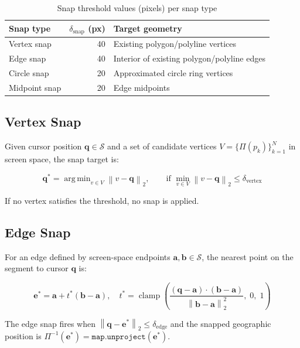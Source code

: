 \documentclass[12pt,a4paper]{article}
\theoremstyle{definition}
\theoremstyle{plain}
\theoremstyle{remark}
\newcommand{\norm}[1]{\left\lVert #1 \right\rVert}
\newcommand{\vect}[1]{\mathbf{#1}}
\DeclareMathOperator*{\argmin}{arg\,min}
\begin{document}
\begin{table}[H]
\centering
\caption{Snap threshold values (pixels) per snap type}
\label{tab:snap_thresholds}
\begin{tabular}{lrl}
\toprule
\textbf{Snap type} & $\delta_{\text{snap}}$ \textbf{(px)} & \textbf{Target geometry} \\
\midrule
Vertex snap    & 40 & Existing polygon/polyline vertices \\
Edge snap      & 40 & Interior of existing polygon/polyline edges \\
Circle snap    & 20 & Approximated circle ring vertices \\
Midpoint snap  & 20 & Edge midpoints \\
\bottomrule
\end{tabular}
\end{table}

\subsection{Vertex Snap}

Given cursor position $\vect{q} \in \mathcal{S}$ and a set of candidate
vertices $V = \{\Pi(p_k)\}_{k=1}^{N}$ in screen space, the snap target is:

\begin{equation}
  \vect{q}^* = \argmin_{v \in V} \norm{v - \vect{q}}_2,
  \qquad \text{if } \min_{v \in V}\norm{v - \vect{q}}_2 \leq \delta_{\text{vertex}}
  \label{eq:vertex_snap}
\end{equation}

If no vertex satisfies the threshold, no snap is applied.

\subsection{Edge Snap}
\label{sec:edge_snap}

For an edge defined by screen-space endpoints $\vect{a}, \vect{b} \in \mathcal{S}$,
the nearest point on the segment to cursor $\vect{q}$ is:

\begin{equation}
  \vect{e}^* = \vect{a} + t^* (\vect{b} - \vect{a}), \quad
  t^* = \operatorname{clamp}\!\left(
    \frac{(\vect{q} - \vect{a}) \cdot (\vect{b} - \vect{a})}
         {\norm{\vect{b} - \vect{a}}_2^2},\; 0,\; 1
  \right)
  \label{eq:edge_snap}
\end{equation}

The edge snap fires when
$\norm{\vect{q} - \vect{e}^*}_2 \leq \delta_{\text{edge}}$
and the snapped geographic position is
$\Pi^{-1}(\vect{e}^*) = \texttt{map.unproject}(\vect{e}^*)$.
\end{document}
